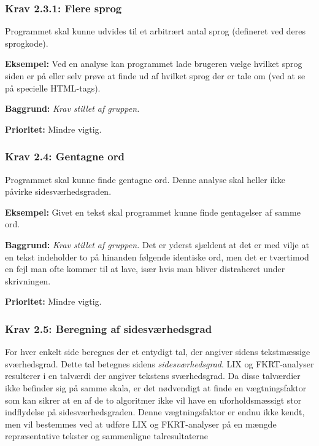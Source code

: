 \documentclass[a4paper,oneside,article, titlepage]{article}
\begin{document}
\subsubsection{Krav 2.3.1: Flere sprog}
Programmet skal kunne udvides til et arbitrært antal sprog (defineret
ved deres sprogkode).
\begin{description}
\item \textbf{Eksempel:} Ved en analyse kan programmet lade brugeren
  vælge hvilket sprog siden er på eller selv prøve at finde ud af
  hvilket sprog der er tale om (ved at se på specielle HTML-tags).
\item \textbf{Baggrund:} \textit{Krav stillet af gruppen.}
\item \textbf{Prioritet:} Mindre vigtig.
\end{description}

\subsubsection{Krav 2.4: Gentagne ord}
Programmet skal kunne finde gentagne ord.
Denne analyse skal heller ikke påvirke sidesværhedsgraden.

\begin{description}
\item \textbf{Eksempel:} Givet en tekst skal programmet kunne finde
  gentagelser af samme ord.
\item \textbf{Baggrund:} \textit{Krav stillet af gruppen.} Det er
  yderst sjældent at det er med vilje at en tekst indeholder to på
  hinanden følgende identiske ord, men det er tværtimod en fejl man
  ofte kommer til at lave, især hvis man bliver distraheret under
  skrivningen.
\item \textbf{Prioritet:} Mindre vigtig.
\end{description}

\subsubsection{Krav 2.5: Beregning af sidesværhedsgrad}

For hver enkelt side beregnes der et entydigt tal, der angiver sidens
tekstmæssige sværhedsgrad. Dette tal betegnes sidens
\textit{sidesværhedsgrad}. LIX og FKRT-analyser resulterer i en talværdi
der angiver tekstens sværhedsgrad. Da disse talværdier ikke befinder
sig på samme skala, er det nødvendigt at finde en vægtningsfaktor som
kan sikrer at en af de to algoritmer ikke vil have en uforholdsmæssigt
stor indflydelse på sidesværhedsgraden. Denne vægtningsfaktor er endnu
ikke kendt, men vil bestemmes ved at udføre LIX og FKRT-analyser på en
mængde repræsentative tekster og sammenligne talresultaterne
\end{document}
